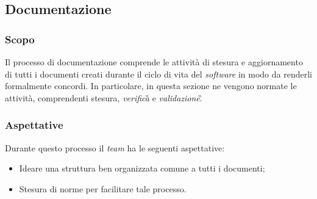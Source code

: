 \subsection{Documentazione}
	\subsubsection{Scopo}
	Il processo di documentazione comprende le attività di stesura e aggiornamento di tutti i documenti creati durante il ciclo di vita del \emph{software} in modo da renderli formalmente concordi. In particolare, in questa sezione ne vengono normate le attività, comprendenti stesura, \emph{verifica}\G{} e \emph{validazione}\G. 
	
	\subsubsection{Aspettative}
	Durante questo processo il \emph{team} ha le seguenti aspettative:
		\begin{itemize}
			\item Ideare una struttura ben organizzata comune a tutti i documenti;
			\item Stesura di norme per facilitare tale processo.
		\end{itemize}
	
